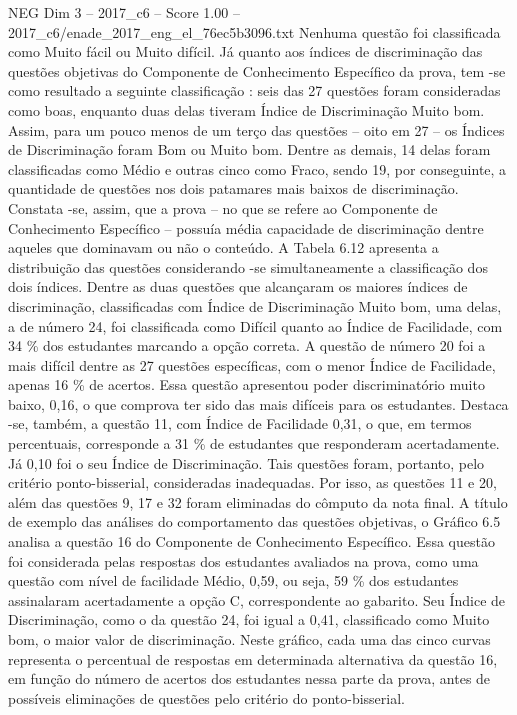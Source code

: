 \begin{textsample}{NEG Dim 3 – 2017\_c6 – Score 1.00 – 2017\_c6/enade\_2017\_eng\_el\_76ec5b3096.txt}
Nenhuma questão foi classificada como Muito fácil ou Muito difícil.
Já quanto aos índices de discriminação das questões objetivas do Componente de Conhecimento Específico da prova, tem -se como resultado a seguinte classificação : seis das 27 questões foram consideradas como boas, enquanto duas delas tiveram Índice de Discriminação Muito bom.
Assim, para um pouco menos de um terço das questões – oito em 27 – os Índices de Discriminação foram Bom ou Muito bom.
Dentre as demais, 14 delas foram classificadas como Médio e outras cinco como Fraco, sendo 19, por conseguinte, a quantidade de questões nos dois patamares mais baixos de discriminação.
Constata -se, assim, que a prova – no que se refere ao Componente de Conhecimento Específico – possuía média capacidade de discriminação dentre aqueles que dominavam ou não o conteúdo.
A Tabela 6.12 apresenta a distribuição das questões considerando -se simultaneamente a classificação dos dois índices.
Dentre as duas questões que alcançaram os maiores índices de discriminação, classificadas com Índice de Discriminação Muito bom, uma delas, a de número 24, foi classificada como Difícil quanto ao Índice de Facilidade, com 34 \% dos estudantes marcando a opção correta.
A questão de número 20 foi a mais difícil dentre as 27 questões específicas, com o menor Índice de Facilidade, apenas 16 \% de acertos.
Essa questão apresentou poder discriminatório muito baixo, 0,16, o que comprova ter sido das mais difíceis para os estudantes.
Destaca -se, também, a questão 11, com Índice de Facilidade 0,31, o que, em termos percentuais, corresponde a 31 \% de estudantes que responderam acertadamente.
Já 0,10 foi o seu Índice de Discriminação.
Tais questões foram, portanto, pelo critério ponto-bisserial, consideradas inadequadas.
Por isso, as questões 11 e 20, além das questões 9, 17 e 32 foram eliminadas do cômputo da nota final.
A título de exemplo das análises do comportamento das questões objetivas, o Gráfico 6.5 analisa a questão 16 do Componente de Conhecimento Específico.
Essa questão foi considerada pelas respostas dos estudantes avaliados na prova, como uma questão com nível de facilidade Médio, 0,59, ou seja, 59 \% dos estudantes assinalaram acertadamente a opção C, correspondente ao gabarito.
Seu Índice de Discriminação, como o da questão 24, foi igual a 0,41, classificado como Muito bom, o maior valor de discriminação.
Neste gráfico, cada uma das cinco curvas representa o percentual de respostas em determinada alternativa da questão 16, em função do número de acertos dos estudantes nessa parte da prova, antes de possíveis eliminações de questões pelo critério do ponto-bisserial.

\end{textsample}
